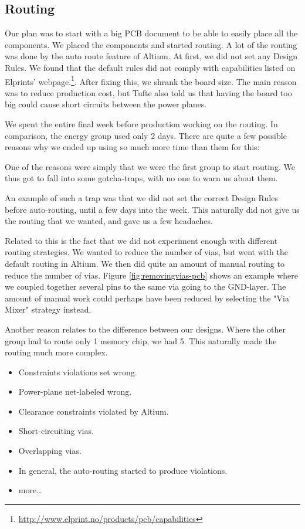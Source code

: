 \subsection {Routing}

Our plan was to start with a big PCB document to be able to easily place all the components. We placed the components and started routing. A lot of the routing was done by the auto route feature of Altium. At first, we did not set any Design Rules. We found that the default rules did not comply with capabilities listed on Elprints' webpage.\footnote {\url{http://www.elprint.no/products/pcb/capabilities}}. After fixing this, we shrank the board size. The main reason was to reduce production cost, but Tufte also told us that having the board too big could cause short circuits between the power planes.

We spent the entire final week before production working on the routing. In comparison, the energy group used only 2 days. There are quite a few possible reasons why we ended up using so much more time than them for this:

One of the reasons were simply that we were the first group to start routing. We thus got to fall into some gotcha-traps, with no one to warn us about them.

An example of such a trap was that we did not set the correct Design Rules before auto-routing, until a few days into the week. This naturally did not give us the routing that we wanted, and gave us a few headaches.

Related to this is the fact that we did not experiment enough with different routing strategies. We wanted to reduce the number of vias, but went with the default routing in Altium. We then did quite an amount of manual routing to reduce the number of vias. Figure \ref{fig:removingvias-pcb} shows an example where we coupled together several pins to the same via going to the GND-layer. The amount of manual work could perhaps have been reduced by selecting the "Via Mixer" strategy instead.


Another reason relates to the difference between our designs. Where the other group had to route only 1 memory chip, we had 5. This naturally made the routing much more complex.

\begin{itemize}
\item Constraints violations set wrong.
\item Power-plane net-labeled wrong.
\item Clearance constraints violated by Altium.
\item Short-circuiting vias.
\item Overlapping vias.
\item In general, the auto-routing started to produce violations.
\item more\ldots
\end{itemize}

